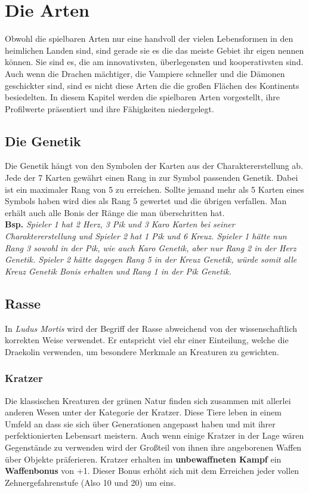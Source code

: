 \chapter{Die Arten} \label{ch:die_arten}


Obwohl die spielbaren Arten nur eine handvoll der vielen Lebensformen in den heimlichen Landen sind, sind gerade sie es die das meiste Gebiet ihr eigen nennen können. Sie sind es, die am innovativsten, überlegensten und kooperativsten sind. Auch wenn die Drachen mächtiger, die Vampiere schneller und die Dämonen geschickter sind, sind es nicht diese Arten die die großen Flächen des Kontinents besiedelten. In diesem Kapitel werden die spielbaren Arten vorgestellt, ihre Profilwerte präsentiert und ihre Fähigkeiten niedergelegt.

\section*{Die Genetik}
Die Genetik hängt von den Symbolen der Karten aus der Charaktererstellung ab. Jede der 7 Karten gewährt einen Rang in zur Symbol passenden Genetik.
Dabei ist ein maximaler Rang von 5 zu erreichen. Sollte jemand mehr als 5 Karten eines Symbols haben wird dies als Rang 5 gewertet und die übrigen verfallen. Man erhält auch alle Bonis der Ränge die man überschritten hat. \\
\textbf{Bsp.} \textit{Spieler 1 hat 2 Herz, 3 Pik und 3 Karo Karten bei seiner Charaktererstellung und Spieler 2 hat 1 Pik und 6 Kreuz. Spieler 1 hätte nun Rang 3 sowohl in der Pik, wie auch Karo Genetik, aber nur Rang 2 in der Herz Genetik. Spieler 2 hätte dagegen Rang 5 in der Kreuz Genetik, würde somit alle Kreuz Genetik Bonis erhalten und Rang 1 in der Pik Genetik.}

\section*{Rasse}
In \textit{Ludus Mortis} wird der Begriff der Rasse abweichend von der wissenschaftlich korrekten Weise verwendet. Er entspricht viel ehr einer Einteilung, welche die Draekolin verwenden, um besondere Merkmale an Kreaturen zu gewichten.

\subsection*{Kratzer}
Die klassischen Kreaturen der grünen Natur finden sich zusammen mit allerlei anderen Wesen unter der Kategorie der Kratzer. Diese Tiere leben in einem Umfeld an dass sie sich über Generationen angepasst haben und mit ihrer perfektionierten Lebensart meistern. Auch wenn einige Kratzer in der Lage wären Gegenstände zu verwenden wird der Großteil von ihnen ihre angeborenen Waffen über Objekte präferieren. Kratzer erhalten im \textbf{unbewaffneten Kampf} ein \textbf{Waffenbonus} von +1. Dieser Bonus erhöht sich mit dem Erreichen jeder vollen Zehnergefahrenstufe (Also 10 und 20) um eins.

